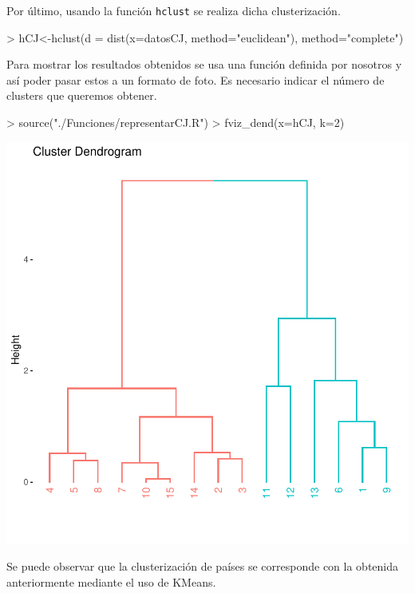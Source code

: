 \documentclass [a4paper] {article}
\begin{document}
\bigskip
Por último, usando la función \texttt{hclust} se realiza dicha clusterización.
\begin{Schunk}
\begin{Sinput}
> hCJ<-hclust(d = dist(x=datosCJ, method="euclidean"), method="complete")
\end{Sinput}
\end{Schunk}

\bigskip
Para mostrar los resultados obtenidos se usa una función definida por nosotros y así poder pasar estos
a un formato de foto. Es necesario indicar el número de clusters que queremos obtener.
\begin{center}
\begin{Schunk}
\begin{Sinput}
> source("./Funciones/representarCJ.R")
> fviz_dend(x=hCJ, k=2) 
\end{Sinput}
\end{Schunk}
\includegraphics{G16-p4-figura1}
\end{center}

\bigskip
Se puede observar que la clusterización de países se corresponde con la obtenida anteriormente mediante
el uso de KMeans.
\end{document}
